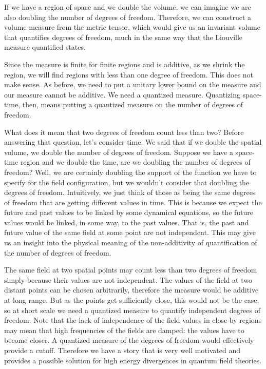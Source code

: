 \documentclass[10pt,twocolumn, nofootinbib]{revtex4-2}
\begin{document}
If we have a region of space and we double the volume, we can imagine we are also doubling the number of degrees of freedom. Therefore, we can construct a volume measure from the metric tensor, which would give us an invariant volume that quantifies degrees of freedom, much in the same way that the Liouville measure quantified states.

Since the measure is finite for finite regions and is additive, as we shrink the region, we will find regions with less than one degree of freedom. This does not make sense. As before, we need to put a unitary lower bound on the measure and our measure cannot be additive. We need a quantized measure. Quantizing space-time, then, means putting a quantized measure on the number of degrees of freedom.

What does it mean that two degrees of freedom count less than two? Before answering that question, let's consider time. We said that if we double the spatial volume, we double the number of degrees of freedom. Suppose we have a space-time region and we double the time, are we doubling the number of degrees of freedom? Well, we are certainly doubling the support of the function we have to specify for the field configuration, but we wouldn't consider that doubling the degrees of freedom. Intuitively, we just think of those as being the same degrees of freedom that are getting different values in time. This is because we expect the future and past values to be linked by some dynamical equations, so the future values would be linked, in some way, to the past values. That is, the past and future value of the same field at some point are not independent. This may give us an insight into the physical meaning of the non-additivity of quantification of the number of degrees of freedom.

The same field at two spatial points may count less than two degrees of freedom simply because their values are not independent. The values of the field at two distant points can be chosen arbitrarily, therefore the measure would be additive at long range. But as the points get sufficiently close, this would not be the case, so at short scale we need a quantized measure to quantify independent degrees of freedom. Note that the lack of independence of the field values in close-by regions may mean that high frequencies of the fields are damped: the values have to become closer. A quantized measure of the degrees of freedom would effectively provide a cutoff. Therefore we have a story that is very well motivated and provides a possible solution for high energy divergences in quantum field theories.
\end{document}
